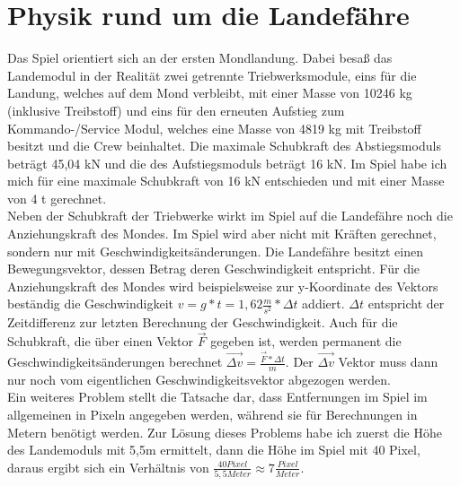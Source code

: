 \documentclass[hidelinks]{article}
\begin{document}
\section{Physik rund um die Landefähre}
Das Spiel orientiert sich an der ersten Mondlandung. Dabei besaß das Landemodul in der Realität zwei getrennte Triebwerksmodule, eins für die Landung, welches auf dem Mond verbleibt, mit einer Masse von 10246 kg (inklusive Treibstoff) und eins für den erneuten Aufstieg zum Kommando-/Service Modul, welches eine Masse von 4819 kg mit Treibstoff besitzt und die Crew beinhaltet\cite{NasaWebsite}. Die maximale Schubkraft des Abstiegsmoduls beträgt 45,04 kN\cite{DescentPropulsionSystem} und die des Aufstiegsmoduls beträgt 16 kN\cite{AscentPropulsionSystem}. 
Im Spiel habe ich mich für eine maximale Schubkraft von 16 kN entschieden und mit einer Masse von 4 t gerechnet.\\
Neben der Schubkraft der Triebwerke wirkt im Spiel auf die Landefähre noch die Anziehungskraft des Mondes. Im Spiel wird aber nicht mit Kräften gerechnet, sondern nur mit Geschwindigkeitsänderungen. Die Landefähre besitzt einen Bewegungsvektor, dessen Betrag deren Geschwindigkeit entspricht. Für die Anziehungskraft des Mondes wird beispielsweise zur y-Koordinate des Vektors beständig die Geschwindigkeit $v=g*t=1,62\frac{m}{s^2}*\Delta t$ addiert. $\Delta t$ entspricht der Zeitdifferenz zur letzten Berechnung der Geschwindigkeit. Auch für die Schubkraft, die über einen Vektor $\vec{F}$ gegeben ist, werden permanent die Geschwindigkeitsänderungen berechnet $\vec{\Delta v}=\frac{\vec{F}*\Delta t}{m}$. Der $\vec{\Delta v}$ Vektor muss dann nur noch vom eigentlichen Geschwindigkeitsvektor abgezogen werden.\\
Ein weiteres Problem stellt die Tatsache dar, dass Entfernungen im Spiel im allgemeinen in Pixeln angegeben werden, während sie für Berechnungen in Metern benötigt werden. Zur Lösung dieses Problems habe ich zuerst die Höhe des Landemoduls mit 5,5m ermittelt\cite{WikipediaLunarModule}, dann die Höhe im Spiel mit 40 Pixel, daraus ergibt sich ein Verhältnis von $\frac{40Pixel}{5,5Meter}\approx7\frac{Pixel}{Meter}$.
\end{document}
